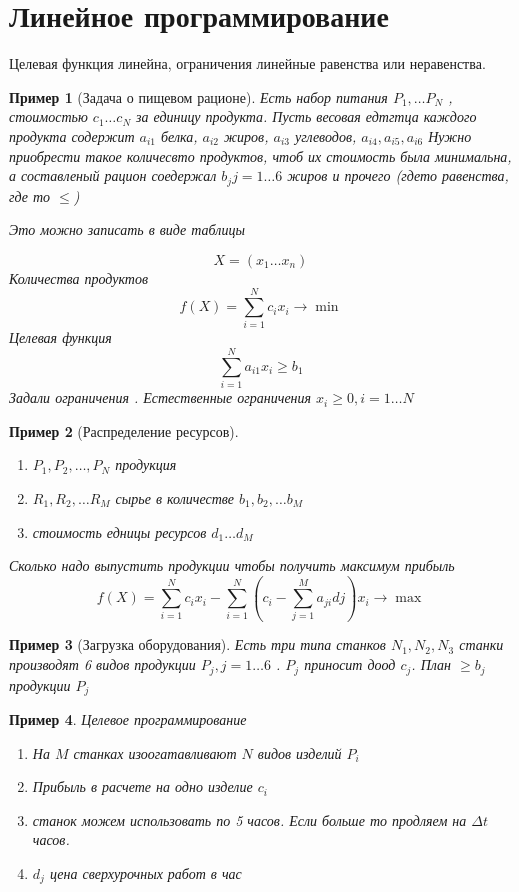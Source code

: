 \documentclass[14pt]{extarticle}
\newtheorem{example}{Пример}
\begin{document}
  \section{Линейное программирование}
  Целевая функция линейна, ограничения линейные равенства или неравенства.
  \begin{example}[Задача о пищевом рационе]
	  Есть набор питания $P_1,\dots P_{N}$ ,
	  стоимостью $c_1 \dots c_{N}$ 
	  за единицу продукта. Пусть
	  весовая едтгтца каждого продукта
	  содержит $a_{i1}$ белка, $a_{i 2}$ жиров,
	  $a_{i 3}$ углеводов, $a_{i 4}, a_{i 5}, a_{i 6}$ 
	  Нужно приобрести такое количесвто продуктов, чтоб
	  их стоимость была минимальна, а составленый рацион соедержал $b_{j} j = 1 \dots 6$ жиров и прочего (гдето равенства, где то $\le $)

	  Это можно записать в виде таблицы

	  \begin{equation}
	  X = (x_1 \dots x_{n})
	  \end{equation} 
	  Количества продуктов
	  \begin{equation}
	  f(X) = \sum_{i= 1}^{N} c_{i} x_{i} \to \min
	  \end{equation} 
	  Целевая функция
	  \begin{equation}
	  \sum_{i =1}^{N} a_{i 1} x_{i} \ge  b_1
	  \end{equation} 
	  Задали ограничения .  Естественные ограничения $x_{i}\ge 0, i =1 \dots N$
  \end{example}
  \begin{example}[Распределение ресурсов]
		\begin{enumerate}
			\item $P_1,P_2,\dots,P_{N}$ 
				продукция
			\item $R_1,R_2,\dots R_{M}$ сырье в количестве 
				$b_1,b_2,\dots b_{M}$ 
			\item стоимость едницы ресурсов $d_1 \dots d_{M}$
		\end{enumerate}
		Сколько надо выпустить продукции чтобы получить
		максимум прибыль
		\begin{equation}
		f(X) = \sum_{i =1}^{N} c_{i} x_{i} -
		\sum_{i = 1}^{N} \left( c_{i} - \sum_{j=1}^{M} a_{ji} dj\right) x_{i} \to \max
		\end{equation} 
  \end{example}
  \begin{example}[Загрузка оборудования]
	  Есть три типа станков $N_1,N_2,N_3$
	  станки производят 6 видов продукции $P_{j},j=1 \dots 6$ . $P_{j}$ приносит доод $c_{j}$. 
	  План $\ge   b_{j}$ продукции $P_{j}$
  \end{example}
  \begin{example}
  	Целевое программирование
	\begin{enumerate}
		\item На $M$ станках изоогатавливают  $N$ видов 
			изделий  $P_{i}$
		 \item Прибыль в расчете на одно изделие $c_{i}$
		 \item станок можем использовать по
			 5 часов. Если больше то продляем на $\Delta t$ часов.
		\item  $d_{j}$ цена сверхурочных работ в час
	\end{enumerate}
  \end{example}
\end{document}

